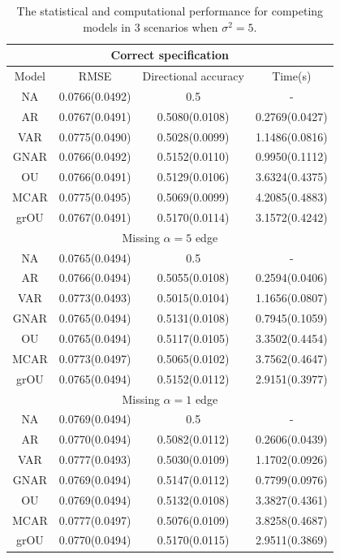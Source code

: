 \documentclass[12pt]{amsart}
\numberwithin{equation}{section}
\newcommand{\1}{\mathbf{1}}
\begin{document}
\begin{table}[htbp]
\centering
\begin{tabular}{|c|c|c|c|}
\hline
\multicolumn{4}{|c|}{Correct specification}
\\
\hline
Model & RMSE & Directional accuracy & Time(s) \\ \hline
NA   & 0.0766(0.0492) & 0.5 & -\\
AR   & 0.0767(0.0491) & 0.5080(0.0108) & 0.2769(0.0427)\\
VAR  & 0.0775(0.0490) & 0.5028(0.0099) & 1.1486(0.0816)\\
GNAR & 0.0766(0.0492) & 0.5152(0.0110) & 0.9950(0.1112)\\
OU   & 0.0766(0.0491) & 0.5129(0.0106) & 3.6324(0.4375)\\
MCAR & 0.0775(0.0495) & 0.5069(0.0099) & 4.2085(0.4883)\\
grOU & 0.0767(0.0491) & 0.5170(0.0114) & 3.1572(0.4242)\\ \hline

\multicolumn{4}{|c|}{Missing $\alpha = 5$ edge}
\\
\hline
NA   & 0.0765(0.0494) & 0.5 & -\\
AR   & 0.0766(0.0494) & 0.5055(0.0108) & 0.2594(0.0406)\\
VAR  & 0.0773(0.0493) & 0.5015(0.0104) & 1.1656(0.0807)\\
GNAR & 0.0765(0.0494) & 0.5131(0.0108) & 0.7945(0.1059)\\
OU   & 0.0765(0.0494) & 0.5117(0.0105) & 3.3502(0.4454)\\
MCAR & 0.0773(0.0497) & 0.5065(0.0102) & 3.7562(0.4647)\\
grOU & 0.0765(0.0494) & 0.5152(0.0112) & 2.9151(0.3977)\\ \hline

\multicolumn{4}{|c|}{Missing $\alpha = 1$ edge}
\\
\hline
NA   & 0.0769(0.0494) & 0.5 & -\\
AR   & 0.0770(0.0494) & 0.5082(0.0112) & 0.2606(0.0439)\\
VAR  & 0.0777(0.0493) & 0.5030(0.0109) & 1.1702(0.0926)\\
GNAR & 0.0769(0.0494) & 0.5147(0.0112) & 0.7799(0.0976)\\
OU   & 0.0769(0.0494) & 0.5132(0.0108) & 3.3827(0.4361)\\
MCAR & 0.0777(0.0497) & 0.5076(0.0109) & 3.8258(0.4687)\\
grOU & 0.0770(0.0494) & 0.5170(0.0115) & 2.9511(0.3869)\\ \hline
\end{tabular}
\caption{The statistical and computational performance for competing models in 3 scenarios when $\sigma^2=5$.}
\label{sim_table_5}
\end{table}
\end{document}
